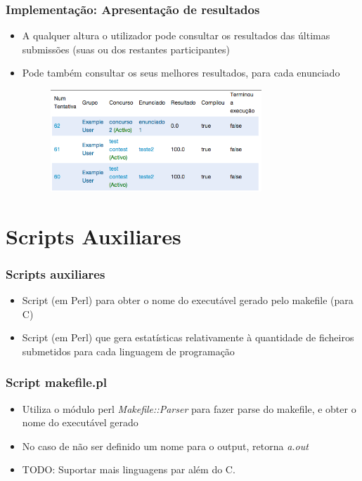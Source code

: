 \documentclass{beamer}
\begin{document}
\begin{frame} \frametitle{Implementação: Apresentação de resultados}
\begin{itemize}
\item A qualquer altura o utilizador pode consultar os resultados das últimas submissões (suas ou dos restantes 
participantes)
\item Pode também consultar os seus melhores resultados, para cada enunciado

\begin{figure}[H]
\begin{center}
\includegraphics[width=0.75\textwidth]{imagens/tentativas}
\end{center}
\end{figure} 

\end{itemize}
\end{frame}

\section{Scripts Auxiliares}
\begin{frame} \frametitle{Scripts auxiliares}
\begin{itemize} 
\item Script (em Perl) para obter o nome do executável gerado pelo makefile (para C)
\item Script (em Perl) que gera estatísticas relativamente à quantidade de ficheiros submetidos para cada linguagem de programação
\end{itemize}
\end{frame}

\begin{frame} \frametitle{Script makefile.pl}
\begin{itemize} 
\item Utiliza o módulo perl \textit{Makefile::Parser} para fazer parse do makefile, e obter o nome do executável gerado
\item No caso de não ser definido um nome para o output, retorna \textit{a.out}
\item TODO: Suportar mais linguagens par além do C.
\end{itemize}
\end{frame}
\end{document}
